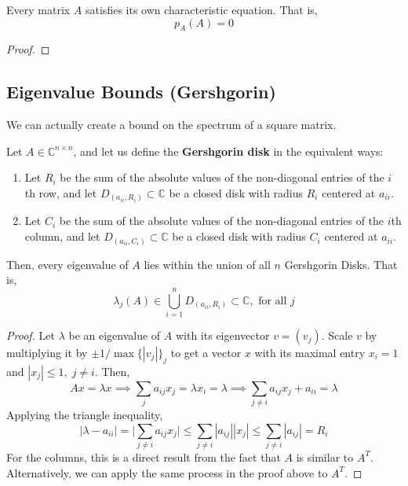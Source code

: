   \begin{theorem}
    \label{thm:cayley-hamilton}
    Every matrix $A$ satisfies its own characteristic equation. That is, 
		\begin{equation}
    	p_{A}(A) = 0
		\end{equation}
  \end{theorem} 
	\begin{proof}
	  
	\end{proof}

\subsection{Eigenvalue Bounds (Gershgorin)}

  We can actually create a bound on the spectrum of a square matrix. 

  \begin{theorem}
    \label{thm:gershgorin-circle-theorem}
		Let $A \in \mathbb{C}^{n \times n}$, and let us define the \textbf{Gershgorin disk} in the equivalent ways: 
		\begin{enumerate}
		  \item Let $R_i$ be the sum of the absolute values of the non-diagonal entries of the $i$th row, and let $D_(a_{i i}, R_i) \subset \mathbb{C}$ be a closed disk with radius $R_i$ centered at $a_{i i}$. 
		  \item Let $C_i$ be the sum of the absolute values of the non-diagonal entries of the $i$th column, and let $D_(a_{i i}, C_i) \subset \mathbb{C}$ be a closed disk with radius $C_i$ centered at $a_{i i}$. 
		\end{enumerate}

		Then, every eigenvalue of $A$ lies within the union of all $n$ Gershgorin Disks. That is, 
		\begin{equation}
    	\lambda_j (A) \in \bigcup_{i= 1}^{n} D_(a_{i i}, R_i) \subset \mathbb{C}, \text{ for all } j
		\end{equation}
  \end{theorem}
  \begin{proof}
    Let $\lambda$ be an eigenvalue of $A$ with its eigenvector $v = (v_j)$. Scale $v$ by multiplying it by $ \pm 1 / \max{\{|v_j|\}_j}$ to get a vector $x$ with its maximal entry $x_i = 1$ and $|x_j| \leq 1, \; j \neq i$. Then, 
		\begin{equation}
    	A x = \lambda x \implies \sum_{j} a_{i j} x_j = \lambda x_i = \lambda \implies \sum_{j \neq i} a_{i j} x_j + a_{i i} = \lambda
		\end{equation}
    Applying the triangle inequality, 
		\begin{equation}
    	| \lambda - a_{i i} | = \bigg| \sum_{j \neq i} a_{i j} x_j\bigg| \leq \sum_{j \neq i} |a_{i j}| |x_j| \leq \sum_{j \neq i} |a_{i j}| = R_i
		\end{equation}
    For the columns, this is a direct result from the fact that $A$ is similar to $A^T$. Alternatively, we can apply the same process in the proof above to $A^T$.
  \end{proof}

